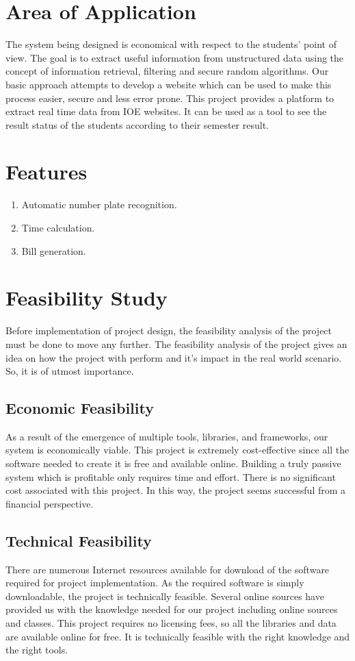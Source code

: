 \section{Area of Application}
 The system being designed is economical with respect to the students’ point of view. The goal is to extract useful information from unstructured data using the concept of information retrieval, ﬁltering and secure random algorithms. Our basic approach attempts to develop a website which can be used to make this process easier, secure and less error prone. This project provides a platform to extract real time data from IOE websites. It can be used as a tool to see the result status of the students according to their semester result.


\section{Features}
\begin{enumerate}
	\item Automatic number plate recognition.
	\item Time calculation.
	\item Bill generation.
\end{enumerate}
\section{Feasibility Study}
Before implementation of project design, the feasibility analysis of the project must be done to move any further. The feasibility analysis of the project gives an idea on how the project with perform and it's impact in the real world scenario. So, it is of utmost importance.
\subsection{Economic Feasibility}
As a result of the emergence of multiple tools, libraries, and frameworks, our system
is economically viable. This project is extremely cost-effective since all the software
needed to create it is free and available online. Building a truly passive system which
is profitable only requires time and effort. There is no significant cost associated with
this project. In this way, the project seems successful from a financial perspective.
\subsection{Technical Feasibility}
  There are numerous Internet resources available for download of the software required
for project implementation. As the required software is simply downloadable, the
project is technically feasible. Several online sources have provided us with the
knowledge needed for our project including online sources and classes. This project requires
no licensing fees, so all the libraries and data are available online for free. It is
technically feasible with the right knowledge and the right tools.
